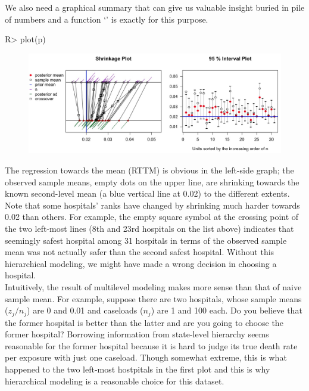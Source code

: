 \documentclass[article]{jss}
\begin{document}
We also need a graphical summary that can give us valuable insight buried in pile of numbers and a function `' is exactly for this purpose.
\begin{CodeChunk}
\begin{CodeInput}
R> plot(p)
\end{CodeInput}
\end{CodeChunk}
\begin{figure}[h]
\begin{center}
\includegraphics[scale=0.25]{hospital1.png}
\end{center}
\end{figure}

The regression towards the mean (RTTM) is obvious in the left-side graph; the observed sample means, empty dots on the upper line, are shrinking towards the known second-level mean (a blue vertical line at 0.02) to the different extents. Note that some hospitals' ranks have changed by shrinking much harder towards 0.02 than others. For example, the empty square symbol at the crossing point of the two left-most lines (8th and 23rd hospitals on the list above) indicates that seemingly safest hospital among 31 hospitals in terms of the observed sample mean was not actually safer than the second safest hospital. Without this hierarchical modeling, we might have made a wrong decision in choosing a hospital.
\\

Intuitively, the result of multilevel modeling makes more sense than that of naive sample mean. For example, suppose there are two hospitals, whose sample means ($z_{j} / n_{j}$) are 0 and 0.01 and caseloads ($n_{j}$) are 1 and 100 each. Do you believe that the former hospital is better than the latter and are you going to choose the former hospital? Borrowing information from state-level hierarchy seems reasonable for the former hospital because it is hard to judge its true death rate per exposure with just one caseload. Though somewhat extreme, this is what happened to the two left-most hostpitals in the first plot and this is why hierarchical modeling is a reasonable choice for this dataset.
\\
\end{document}
